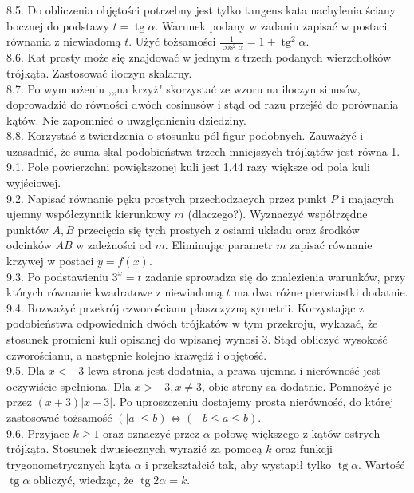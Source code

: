 \documentclass[10pt]{article}
\begin{document}
8.5. Do obliczenia objętości potrzebny jest tylko tangens kata nachylenia ściany bocznej do podstawy $t=\operatorname{tg} \alpha$. Warunek podany w zadaniu zapisać w postaci równania z niewiadomą $t$. Użyć tożsamości $\frac{1}{\cos ^{2} \alpha}=1+\operatorname{tg}^{2} \alpha$.\\
8.6. Kat prosty może się znajdować w jednym z trzech podanych wierzchołków trójkąta. Zastosować iloczyn skalarny.\\
8.7. Po wymnożeniu ,„na krzyż" skorzystać ze wzoru na iloczyn sinusów, doprowadzić do równości dwóch cosinusów i stąd od razu przejść do porównania kątów. Nie zapomnieć o uwzględnieniu dziedziny.\\
8.8. Korzystać z twierdzenia o stosunku pól figur podobnych. Zauważyć i uzasadnić, że suma skal podobieństwa trzech mniejszych trójkątów jest równa 1.\\
9.1. Pole powierzchni powiększonej kuli jest 1,44 razy większe od pola kuli wyjściowej.\\
9.2. Napisać równanie pęku prostych przechodzacych przez punkt $P$ i majacych ujemny współczynnik kierunkowy $m$ (dlaczego?). Wyznaczyć współrzędne punktów $A, B$ przecięcia się tych prostych z osiami układu oraz środków odcinków $A B$ w zależności od $m$. Eliminując parametr $m$ zapisać równanie krzywej w postaci $y=f(x)$.\\
9.3. Po podstawieniu $3^{x}=t$ zadanie sprowadza się do znalezienia warunków, przy których równanie kwadratowe z niewiadomą $t$ ma dwa różne pierwiastki dodatnie.\\
9.4. Rozważyć przekrój czworościanu płaszczyzną symetrii. Korzystając z podobieństwa odpowiednich dwóch trójkatów w tym przekroju, wykazać, że stosunek promieni kuli opisanej do wpisanej wynosi 3. Stąd obliczyć wysokość czworościanu, a następnie kolejno krawędź i objętość.\\
9.5. Dla $x<-3$ lewa strona jest dodatnia, a prawa ujemna i nierówność jest oczywiście spełniona. Dla $x>-3, x \neq 3$, obie strony sa dodatnie. Pomnożyć je przez $(x+3)|x-3|$. Po uproszczeniu dostajemy prosta nierówność, do której zastosować tożsamość $(|a| \leq b) \Leftrightarrow(-b \leq a \leq b)$.\\
9.6. Przyjacc $k \geq 1$ oraz oznaczyć przez $\alpha$ połowę większego z kątów ostrych trójkąta. Stosunek dwusiecznych wyrazić za pomocą $k$ oraz funkcji trygonometrycznych kąta $\alpha$ i przekształcić tak, aby wystapił tylko $\operatorname{tg} \alpha$. Wartość $\operatorname{tg} \alpha$ obliczyć, wiedząc, że $\operatorname{tg} 2 \alpha=k$.\\
\end{document}
